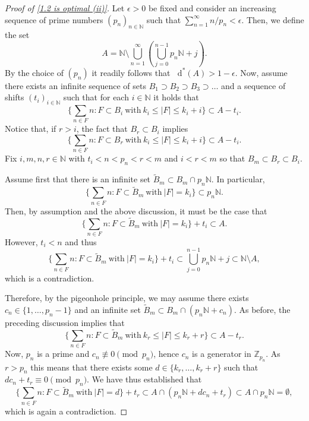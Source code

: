 \documentclass[10pt,a4paper]{amsart}
\newcommand*\diff{\mathop{}\!\mathrm{d}}
\newcommand{\N}{\mathbb{N}}
\newcommand{\Z}{\mathbb{Z}}
\begin{document}
\begin{proof}[Proof of \cref{1.2 is optimal (ii)}]
Let $\epsilon>0$ be fixed and consider an increasing sequence of prime numbers $(p_n)_{n\in \N}$ such that $\sum_{n=1}^{\infty} n/p_n <\epsilon.$ Then, we define the set 
\begin{equation} \label{eq set counterex}
    A=\N \setminus \bigcup_{n=1}^{\infty} \left( \bigcup_{j=0}^{n-1}p_n\N + j \right).
\end{equation}
By the choice of $(p_n)$ it readily follows that $\diff^*(A)>1-\epsilon$. Now, assume there exists an infinite sequence of sets $B_1 \supset B_2 \supset B_3 \supset \dots$ and a sequence of shifts $(t_i)_{i\in \N}$ such that for each $i\in \N$ it holds that
$$ \bigg\{\sum_{n\in F}n: F\subset B_i\ \text{with}\ k_i\leq |F|\leq k_i+i \bigg\} \subset A-t_i.$$
Notice that, if $r>i$, the fact that $B_{r} \subset B_i$ implies
$$\bigg\{\sum_{n\in F}n: F\subset B_r\ \text{with}\ k_i\leq |F|\leq k_i+i \bigg\} \subset A-t_i.$$
Fix $i,m,n,r\in \N$ with $t_{i}<n<p_n<r<m$ and $i<r<m$ so that $B_m \subset B_{r} \subset B_{i}$.

Assume first that there is an infinite set $\tilde{B}_m\subset B_m \cap  p_n\N$. In particular, $$\bigg\{\sum_{n\in F}n: F\subset \tilde{B}_m\ \text{with}\  |F|= k_i \bigg\} \subset p_n \N.$$  Then, by assumption and the above 
discussion, it must be the case that 
$$\bigg\{\sum_{n\in F}n: F\subset \tilde{B}_m\ \text{with}\  |F|= k_i \bigg\}+t_{i} \subset A.$$
However, $t_{i}<n$ and thus 
$$\bigg\{\sum_{n\in F}n: F\subset \tilde{B}_m\ \text{with}\  |F|= k_i \bigg\}+t_{i}  \subset \bigcup_{j=0}^{n-1} p_n\N + j \subset \N\setminus A,$$
which is a contradiction. 

Therefore, by the pigeonhole principle, we may assume there exists $c_n\in \{1,\ldots,p_n-1\}$ and an infinite set $\tilde{B}_{m} \subset B_m \cap (p_n\N+c_n)$. As before, the preceding discussion implies that
$$\bigg\{\sum_{n\in F}n: F\subset \tilde{B}_m\ \text{with}\ k_r\leq |F|\leq k_r+r \bigg\} \subset A-t_{r}.$$
Now, $p_n$ is a prime and $c_n \not\equiv 0 \pmod {p_n}$, hence $c_n$ is a generator in $\Z_{p_n}$. As $r>p_n$ this means that there exists some $d\in \{k_{r},\ldots,k_{r}+r\}$ such that $dc_n+t_{r} \equiv 0 \pmod{p_n}.$ 
We have thus established that 
$$\bigg\{\sum_{n\in F}n: F\subset \tilde{B}_m\ \text{with}\ |F|=d \bigg\}+t_r \subset A \cap \left(p_n\N + d c_n+t_{r}\right) \subset A \cap p_n\N = \emptyset,$$
which is again a contradiction. 
\end{proof}
\end{document}
